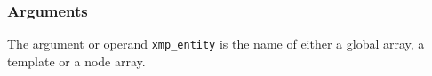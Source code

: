 \subsubsection*{Arguments}

The argument or operand {\tt xmp\_entity} is the name of either a global
array, a template or a node array.

%
%
%
%
%
%
%
%
%
%
%
%
%
